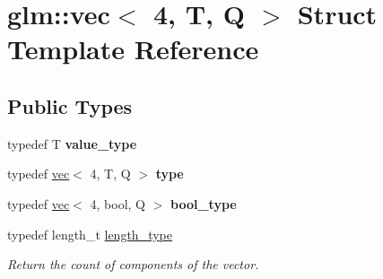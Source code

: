 \hypertarget{structglm_1_1vec_3_014_00_01T_00_01Q_01_4}{}\section{glm\+:\+:vec$<$ 4, T, Q $>$ Struct Template Reference}
\label{structglm_1_1vec_3_014_00_01T_00_01Q_01_4}
\subsection*{Public Types}
\begin{DoxyCompactItemize}
\item 
\mbox{\label{structglm_1_1vec_3_014_00_01T_00_01Q_01_4_a020e92356dcff10cc371130596325415}} 
typedef T {\bfseries value\+\_\+type}
\item 
\mbox{\label{structglm_1_1vec_3_014_00_01T_00_01Q_01_4_ab2b893dfe27b0d0f154d66315f35de47}} 
typedef \hyperlink{structglm_1_1vec}{vec}$<$ 4, T, Q $>$ {\bfseries type}
\item 
\mbox{\label{structglm_1_1vec_3_014_00_01T_00_01Q_01_4_a175b3fdeb819aab912118ac1605b675b}} 
typedef \hyperlink{structglm_1_1vec}{vec}$<$ 4, bool, Q $>$ {\bfseries bool\+\_\+type}
\item 
\mbox{\label{structglm_1_1vec_3_014_00_01T_00_01Q_01_4_af1c8f56963141951f4a4724b47e072d9}} 
typedef length\+\_\+t \hyperlink{structglm_1_1vec_3_014_00_01T_00_01Q_01_4_af1c8f56963141951f4a4724b47e072d9}{length\+\_\+type}
\begin{DoxyCompactList}\small\item\em Return the count of components of the vector. \end{DoxyCompactList}\end{DoxyCompactItemize}
